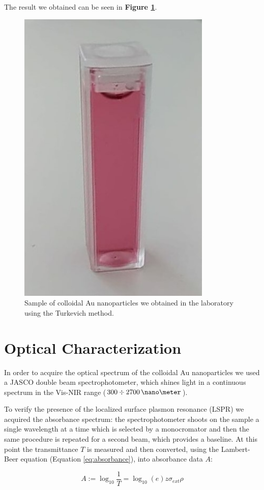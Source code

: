 \documentclass[twocolumn]{article}
\begin{document}
\begin{multicols}{2}
\noindent
The result we obtained can be seen in \textbf{Figure \ref{fig:sample}}.

\begin{figure}[H]
    \centering
    \includegraphics[width=0.5\linewidth]{image/data/turkevich.pdf}
    \caption{Sample of colloidal Au nanoparticles we obtained in the laboratory using the Turkevich method.}
    \label{fig:sample}
\end{figure}

\section{Optical Characterization}
\label{sec:optic_char}
\noindent
In order to acquire the optical spectrum of the colloidal Au nanoparticles we used a JASCO double beam spectrophotometer, which shines light in a continuous spectrum in the Vis-NIR range ($300\div 2700\, \nano\meter $).

To verify the presence of the localized surface plasmon resonance (LSPR) we acquired the absorbance spectrum: the spectrophotometer shoots on the sample a single wavelength at a time which is selected by a monocromator and then the same procedure is repeated for a second beam, which provides a baseline. At this point the transmittance $T$ is measured and then converted, using the Lambert-Beer equation (Equation \ref{eq:absorbance}), into absorbance data $A$: 

\begin{equation}
    A:=\log_{10}\frac{1}{T}=\log_{10}(e)z \sigma_{ext} \rho
    \label{eq:absorbance}
\end{equation}


\end{multicols}
\end{document}
